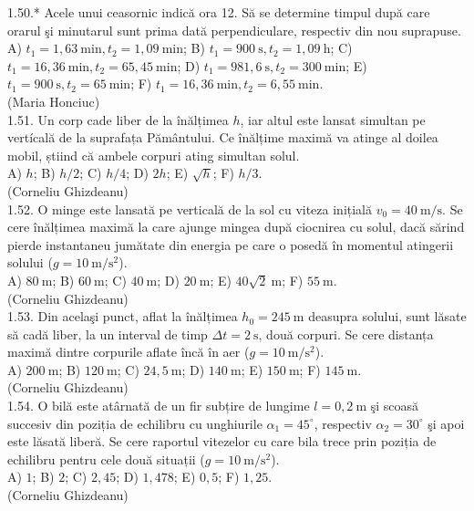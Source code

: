 \documentclass[10pt]{article}
\begin{document}
1.50.* Acele unui ceasornic indică ora 12. Să se determine timpul după care orarul şi minutarul sunt prima dată perpendiculare, respectiv din nou suprapuse.\\ A) $t_{1}=1,63 \mathrm{~min}, t_{2}=1,09 \mathrm{~min}$; B) $t_{1}=900 \mathrm{~s}, t_{2}=1,09 \mathrm{~h}$; C) $t_{1}=16,36 \mathrm{~min}, t_{2}=65,45 \mathrm{~min}$; D) $t_{1}=981,6 \mathrm{~s}, t_{2}=300 \mathrm{~min}$; E) $t_{1}=900 \mathrm{~s}, t_{2}=65 \mathrm{~min}$; F) $t_{1}=16,36 \mathrm{~min}, t_{2}=6,55 \mathrm{~min}$.\\ (Maria Honciuc)\\

1.51. Un corp cade liber de la înălțimea $h$, iar altul este lansat simultan pe vertícală de la suprafața Pământului. Ce înălțime maximă va atinge al doilea mobil, știind că ambele corpuri ating simultan solul.\\ A) $h$; B) $h / 2$; C) $h / 4$; D) $2 h$; E) $\sqrt{h}$; F) $h / 3$.\\ (Corneliu Ghizdeanu)\\

1.52. O minge este lansată pe verticală de la sol cu viteza inițială $v_{0}=40 \mathrm{~m} / \mathrm{s}$. Se cere înălțimea maximă la care ajunge mingea după ciocnirea cu solul, dacă sărind pierde instantaneu jumătate din energia pe care o posedă în momentul atingerii solului ($g=10 \mathrm{~m} / \mathrm{s}^{2}$).\\ A) $80 \mathrm{~m}$; B) $60 \mathrm{~m}$; C) $40 \mathrm{~m}$; D) $20 \mathrm{~m}$; E) $40 \sqrt{2} \mathrm{~m}$; F) $55 \mathrm{~m}$.\\ (Corneliu Ghizdeanu)\\

1.53. Din acelaşi punct, aflat la înălțimea $h_{0}=245 \mathrm{~m}$ deasupra solului, sunt lăsate să cadă liber, la un interval de timp $\Delta t=2 \mathrm{~s}$, două corpuri. Se cere distanța maximă dintre corpurile aflate încă în aer ($g=10 \mathrm{~m} / \mathrm{s}^{2}$).\\ A) $200 \mathrm{~m}$; B) $120 \mathrm{~m}$; C) $24,5 \mathrm{~m}$; D) $140 \mathrm{~m}$; E) $150 \mathrm{~m}$; F) $145 \mathrm{~m}$.\\ (Corneliu Ghizdeanu)\\

1.54. O bilă este atârnată de un fir subțire de lungime $l=0,2 \mathrm{~m}$ şi scoasă succesiv din poziția de echilibru cu unghiurile $\alpha_{1}=45^{\circ}$, respectiv $\alpha_{2}=30^{\circ}$ şi apoi este lăsată liberă. Se cere raportul vitezelor cu care bila trece prin poziția de echilibru pentru cele două situații ($g=10 \mathrm{~m} / \mathrm{s}^{2}$).\\ A) $1$; B) $2$; C) $2,45$; D) $1,478$; E) $0,5$; F) $1,25$.\\ (Corneliu Ghizdeanu)\\
\end{document}
